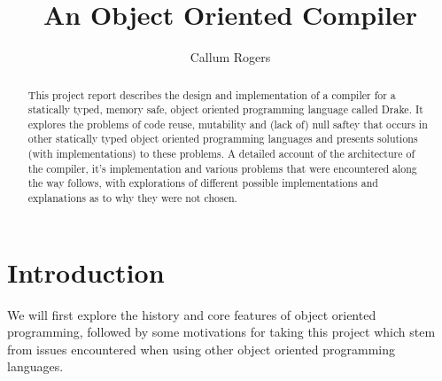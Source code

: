 \documentclass{article}
\newcommand{\plname}[0]{Drake\xspace}
\begin{document}
\title{An Object Oriented Compiler}
\author{Callum Rogers}
\maketitle

\begin{abstract}
This project report describes the design and implementation of a compiler for a statically typed, memory safe, object oriented programming language called \plname. It explores the problems of code reuse, mutability and (lack of) null saftey that occurs in other statically typed object oriented programming languages and presents solutions (with implementations) to these problems. A detailed account of the architecture of the compiler, it's implementation and various problems that were encountered along the way follows, with explorations of different possible implementations and explanations as to why they were not chosen.
\end{abstract}

\pagebreak
\tableofcontents
\pagebreak

\section{Introduction}
We will first explore the history and core features of object oriented programming, followed by some motivations for taking this project which stem from issues encountered when using other object oriented programming languages.
\end{document}

